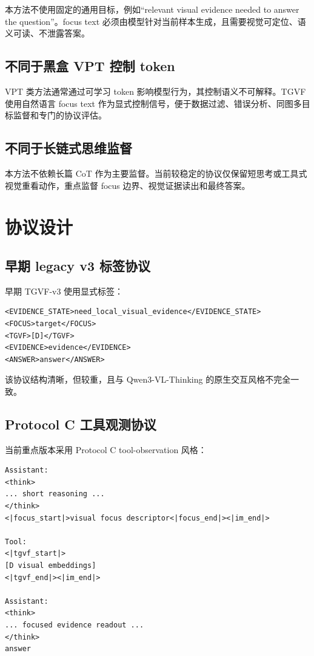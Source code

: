 \documentclass[10pt,twocolumn]{ctexart}
\begin{document}
本方法不使用固定的通用目标，例如“relevant visual evidence needed to answer the question”。focus text 必须由模型针对当前样本生成，且需要视觉可定位、语义可读、不泄露答案。

\subsection{不同于黑盒 VPT 控制 token}

VPT 类方法通常通过可学习 token 影响模型行为，其控制语义不可解释。TGVF 使用自然语言 focus text 作为显式控制信号，便于数据过滤、错误分析、同图多目标监督和专门的协议评估。

\subsection{不同于长链式思维监督}

本方法不依赖长篇 CoT 作为主要监督。当前较稳定的协议仅保留短思考或工具式视觉重看动作，重点监督 focus 边界、视觉证据读出和最终答案。

\section{协议设计}

\subsection{早期 legacy v3 标签协议}

早期 TGVF-v3 使用显式标签：

\begin{verbatim}
<EVIDENCE_STATE>need_local_visual_evidence</EVIDENCE_STATE>
<FOCUS>target</FOCUS>
<TGVF>[D]</TGVF>
<EVIDENCE>evidence</EVIDENCE>
<ANSWER>answer</ANSWER>
\end{verbatim}

该协议结构清晰，但较重，且与 Qwen3-VL-Thinking 的原生交互风格不完全一致。

\subsection{Protocol C 工具观测协议}

当前重点版本采用 Protocol C tool-observation 风格：

\begin{verbatim}
Assistant:
<think>
... short reasoning ...
</think>
<|focus_start|>visual focus descriptor<|focus_end|><|im_end|>

Tool:
<|tgvf_start|>
[D visual embeddings]
<|tgvf_end|><|im_end|>

Assistant:
<think>
... focused evidence readout ...
</think>
answer
\end{verbatim}
\end{document}
